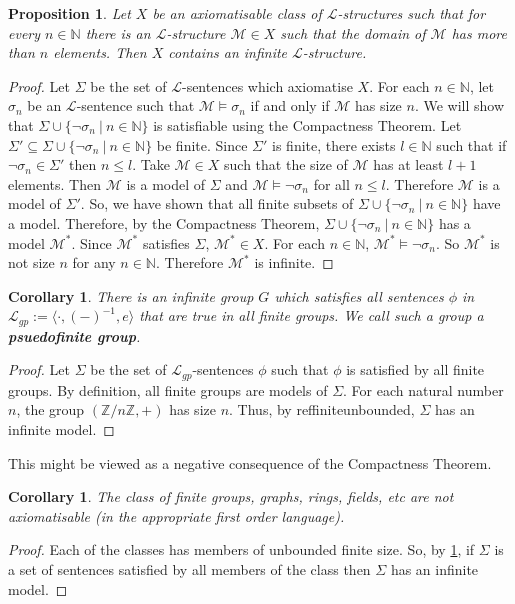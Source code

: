 \documentclass[11pt]{article}
\newtheorem{proposition}[theorem]{Proposition}
\newtheorem{cor}[theorem]{Corollary}
\newcommand{\mcal}[1]{\mathcal{#1}}
\newcommand{\Z}{\mathbb{Z}}
\newcommand{\N}{\mathbb{N}}
\newcommand{\st}{\ \vert \ }
\begin{document}
\begin{proposition}\label{finiteunbounded}
Let $X$ be an axiomatisable class of $\mcal{L}$-structures such that for every $n\in\N$ there is an $\mcal{L}$-structure $\mcal{M}\in X$ such that the domain of $\mcal{M}$ has more than $n$ elements. Then $X$ contains an infinite $\mcal{L}$-structure.
\end{proposition}
\begin{proof}
Let $\Sigma$ be the set of $\mcal{L}$-sentences which axiomatise $X$. For each $n\in\N$, let $\sigma_n$ be an $\mcal{L}$-sentence such that $\mcal{M}\models \sigma_n$ if and only if $\mcal{M}$ has size $n$. We will show that $\Sigma\cup\{\neg\sigma_n\st n\in\N\}$ is satisfiable using the Compactness Theorem. Let $\Sigma'\subseteq \Sigma\cup\{\neg\sigma_n\st n\in\N\}$ be finite. Since $\Sigma'$ is finite, there exists $l\in\N$ such that if $\neg\sigma_n\in\Sigma'$ then $n\leq l$. Take $\mcal{M}\in X$ such that the size of $\mcal{M}$ has at least $l+1$ elements. Then $\mcal{M}$ is a model of $\Sigma$ and $\mcal{M}\models \neg\sigma_n$ for all $n\leq l$. Therefore $\mcal{M}$ is a model of $\Sigma'$. So, we have shown that all finite subsets of $\Sigma\cup\{\neg\sigma_n\st n\in\N\}$ have a model. Therefore, by the Compactness Theorem, $\Sigma\cup\{\neg\sigma_n\st n\in\N\}$ has a model $\mcal{M}^*$. Since $\mcal{M}^*$ satisfies $\Sigma$, $\mcal{M}^*\in X$. For each $n\in\N$, $\mcal{M}^*\models \neg\sigma_n$. So $\mcal{M}^*$ is not size $n$ for any $n\in \N$. Therefore $\mcal{M}^*$ is infinite.

\end{proof}

\begin{cor}
There is an infinite group $G$ which satisfies all sentences $\phi$ in $\mcal{L}_{gp}:=\langle \cdot, (-)^{-1}, e\rangle$ that are true in all finite groups. We call such a group a \textbf{psuedofinite group}.
\end{cor}
\begin{proof}
Let $\Sigma$ be the set of $\mcal{L}_{gp}$-sentences $\phi$ such that $\phi$ is satisfied by all finite groups. By definition, all finite groups are models of $\Sigma$. For each natural number $n$, the group $(\Z/n\Z,+)$ has size $n$. Thus, by ref{finiteunbounded},  $\Sigma$ has an infinite model.
\end{proof}

This might be viewed as a negative consequence of the Compactness Theorem.
\begin{cor}
The class of finite groups, graphs, rings, fields, etc are not axiomatisable (in the appropriate first order language).
\end{cor}
\begin{proof}
Each of the classes has members of unbounded finite size. So, by \ref{finiteunbounded}, if $\Sigma$ is a set of sentences satisfied by all members of the class then $\Sigma$ has an infinite model.
\end{proof}
\end{document}
